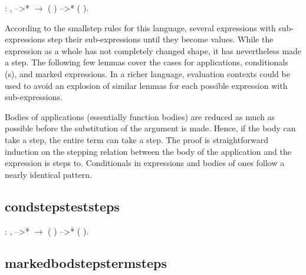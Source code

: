 \documentclass[12pt]{report}
\begin{document}
\begin{coqdoccode}
\coqdocemptyline
\coqdocindent{1.00em}
  : \coqdockw{\ensuremath{\forall}}   ,\coqdoceol
\coqdocindent{2.00em}
 -->*  \ensuremath{\rightarrow}\coqdoceol
\coqdocindent{2.00em}
(  ) -->* (  ).\coqdoceol
\coqdocemptyline
\end{coqdoccode}
According to the smallstep rules for this language, several
expressions with sub-expressions step their sub-expressions until they
become values. While the expression as a whole has not completely
changed shape, it has nevertheless made a step. The following few
lemmas cover the cases for applications, conditionals (s), and
marked expressions. In a richer language, evaluation contexts could
be used to avoid an explosion of similar lemmas for each possible
expression with sub-expressions. 

 Bodies of applications (essentially function bodies) are reduced
as much as possible before the substitution of the argument is
made. Hence, if the body can take a step, the entire term can take
a step. The proof is straightforward induction on the stepping
relation between the body of the application and the expression is
steps to. Conditionals in  expressions and bodies of  ones follow a nearly identical pattern. 

\subsection{condstepsteststeps}

\begin{coqdoccode}
\coqdocemptyline
\coqdocindent{1.00em}
  : \coqdockw{\ensuremath{\forall}}    ,\coqdoceol
\coqdocindent{2.00em}
 -->*  \ensuremath{\rightarrow}\coqdoceol
\coqdocindent{2.00em}
(   ) -->* (   ).\coqdoceol
\coqdocemptyline
\end{coqdoccode}
\subsection{markedbodstepstermsteps}
\end{document}
